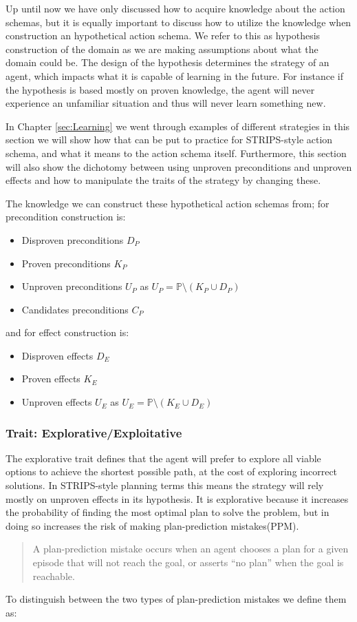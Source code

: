 \documentclass[../Master.tex]{subfiles}
\begin{document}
	Up until now we have only discussed how to acquire knowledge about the action schemas, but it is equally important to discuss how to utilize the knowledge when construction an hypothetical action schema.
	We refer to this as hypothesis construction of the domain as we are making assumptions about what the domain could be.
	The design of the hypothesis determines the strategy of an agent, which impacts what it is capable of learning in the future.
	For instance if the hypothesis is based mostly on proven knowledge, the agent will never experience an unfamiliar situation and thus will never learn something new.

	In Chapter \ref{sec:Learning} we went through examples of different strategies in this section we will show how that can be put to practice for STRIPS-style action schema, and what it means to the action schema itself.
	Furthermore, this section will also show the dichotomy between using unproven preconditions and unproven effects and how to manipulate the traits of the strategy by changing these.

	The knowledge we can construct these hypothetical action schemas from; for precondition construction is:

	\begin{itemize}
		\item Disproven preconditions $D_P$
		\item Proven preconditions $K_P$
		\item Unproven preconditions $U_P$ as $U_P = \mathbb{P} \setminus (K_P \cup D_P)$
		\item Candidates preconditions $C_P$
	\end{itemize}

	and for effect construction is:

	\begin{itemize}
		\item Disproven effects $D_E$
		\item Proven effects $K_E$
		\item Unproven effects $U_E$ as $U_E = \mathbb{P} \setminus (K_E \cup D_E)$
	\end{itemize}

\subsubsection{Trait: Explorative/Exploitative}

	The explorative trait defines that the agent will prefer to explore all viable options to achieve the shortest possible path, at the cost of exploring incorrect solutions.
	In STRIPS-style planning terms this means the strategy will rely mostly on unproven effects in its hypothesis.
	It is explorative because it increases the probability of finding the most optimal plan to solve the problem,
	but in doing so increases the risk of making plan-prediction mistakes(PPM).
	\begin{quotation}
				A plan-prediction mistake occurs when an
				agent chooses a plan for a given episode that will not reach
				the goal, or asserts “no plan” when the goal is reachable. \cite{Walsh2008}
	\end{quotation}
	To distinguish between the two types of plan-prediction mistakes we define them as:
\end{document}
